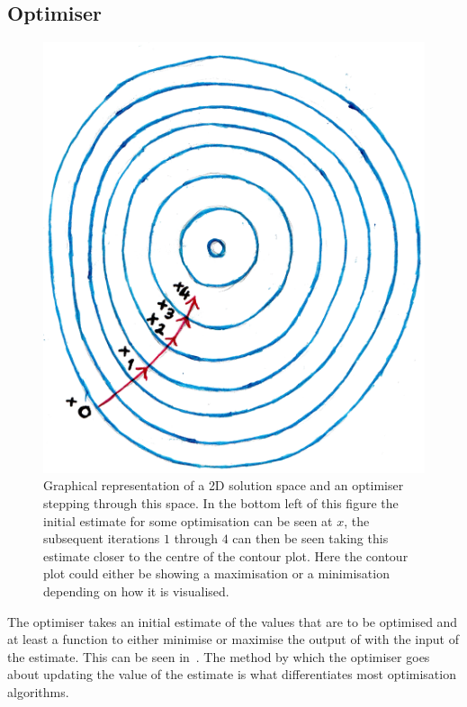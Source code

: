         \subsection{Optimiser} \label{sec:optimiser}
            \begin{figure}
                \centering
                    
                \includegraphics[width=1.0\linewidth]{figures/background_optimisation.png}
                    
                \captionsetup{singlelinecheck=false, justification=raggedright}
                \caption{Graphical representation of a \gls{2D} solution space and an optimiser stepping through this space. In the bottom left of this figure the initial estimate for some optimisation can be seen at $x$, the subsequent iterations $1$ through $4$ can then be seen taking this estimate closer to the centre of the contour plot. Here the contour plot could either be showing a maximisation or a minimisation depending on how it is visualised.} \label{fig:optimiser_optimisation}
            \end{figure}
            
            The optimiser takes an initial estimate of the values that are to be optimised and at least a function to either minimise or maximise the output of with the input of the estimate. This can be seen in~. The method by which the optimiser goes about updating the value of the estimate is what differentiates most optimisation algorithms.
            
